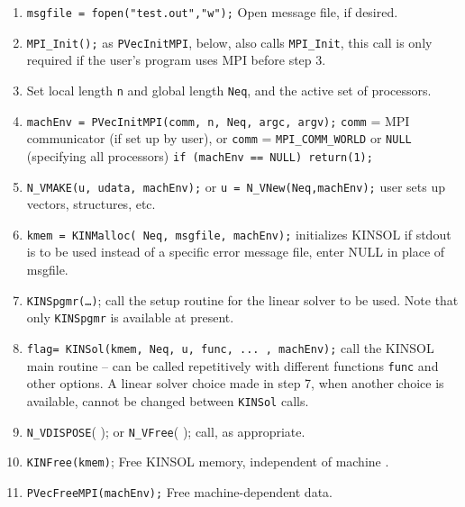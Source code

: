 \documentclass[11pt]{article}
\begin{document}
\begin{enumerate}

\item  {\tt msgfile = fopen("test.out","w");}      Open message file, if 
desired.
                                     

\item  {\tt MPI\_Init();}     as {\tt PVecInitMPI}, below, also calls 
{\tt MPI\_Init}, this call is only required if the user's program uses MPI before step 3.


\item  Set local length {\tt n} and global length {\tt Neq}, and the active 
set of processors.


\item  {\tt machEnv = PVecInitMPI(comm, n, Neq, argc, argv);}
         {\tt comm} = MPI communicator (if set up by user), or
         {\tt comm} = {\tt MPI\_COMM\_WORLD} or {\tt NULL} (specifying all processors)   
    {\tt if (machEnv == NULL) return(1);}
   


\item  {\tt N\_VMAKE(u, udata, machEnv);}     
      or
    {\tt u = N\_VNew(Neq,machEnv);}     user sets up vectors, structures, etc.
  


\item  {\tt kmem = KINMalloc( Neq, msgfile, machEnv);}     initializes KINSOL 
    if stdout is to be used instead of a specific error message file, 
           enter NULL in place of msgfile.  
   

\item  {\tt KINSpgmr(\ldots)};  call the setup routine for the linear solver to be used.
          Note that only {\tt KINSpgmr} is available at present.
    
\item  {\tt flag= KINSol(kmem, Neq, u, func, ... , machEnv);}
       call the KINSOL main routine -- can be called repetitively with
       different functions {\tt func} and other options. A linear solver
       choice made in step 7, when another choice is available, cannot 
           be changed between {\tt KINSol} calls.   
   
\item {\tt N\_VDISPOSE}(  ); or {\tt N\_VFree}( ); call, as appropriate.

\item  {\tt KINFree(kmem)};       Free KINSOL memory, independent of machine   .
   


\item  {\tt PVecFreeMPI(machEnv);}        Free machine-dependent data.
\end{enumerate}
\vspace{.2 in}
\end{document}
